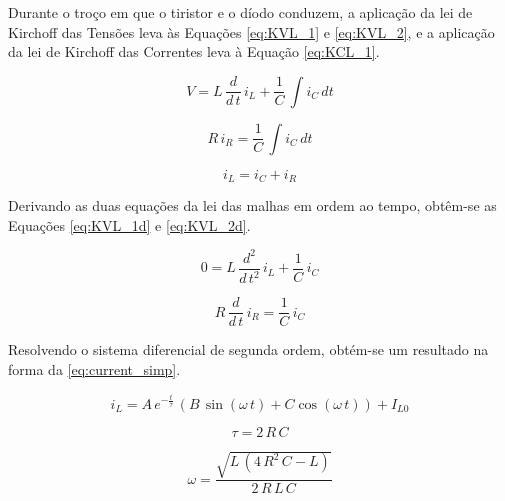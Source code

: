 \documentclass[a4paper,11pt]{article}
\numberwithin{equation}{section}
\begin{document}
Durante o troço em que o tiristor e o díodo conduzem, a aplicação da lei de Kirchoff das Tensões leva às Equações \ref{eq:KVL_1} e \ref{eq:KVL_2}, e a aplicação da lei de Kirchoff das Correntes leva à Equação \ref{eq:KCL_1}.

\begin{equation}
\label{eq:KVL_1}
V = L\,\frac{d}{d\,t}\,i_L + \frac{1}{C}\,\int i_C\,dt
\end{equation}

\begin{equation}
\label{eq:KVL_2}
R\,i_R = \frac{1}{C}\,\int i_C\,dt
\end{equation}

\begin{equation}
\label{eq:KCL_1}
i_L = i_C + i_R
\end{equation}

Derivando as duas equações da lei das malhas em ordem ao tempo, obtêm-se as Equações \ref{eq:KVL_1d} e \ref{eq:KVL_2d}.

\begin{equation}
\label{eq:KVL_1d}
0 = L\,\frac{d^2}{d\,t^2}\,i_L + \frac{1}{C}\,i_C
\end{equation}

\begin{equation}
\label{eq:KVL_2d}
R\,\frac{d}{d\,t}\,i_R = \frac{1}{C}\,i_C
\end{equation}

Resolvendo o sistema diferencial de segunda ordem, obtém-se um resultado na forma da \autoref{eq:current_simp}.

\begin{equation}
\label{eq:current_simp}
i_L = A\, e^{-\frac{t}{\tau}}\,(B\,\sin{(\omega\,t)}+C\cos{(\omega\,t)}) + I_{L0}
\end{equation}

\begin{equation}
\label{eq:time_constant}
\tau = 2\,R\,C
\end{equation}

\begin{equation}
\label{eq:freq}
\omega = \frac{\sqrt{L\,(4\,R^2\,C-L)}}{2\,R\,L\,C}
\end{equation}
\end{document}
